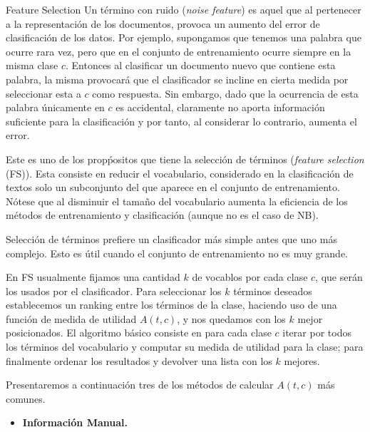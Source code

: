 \documentclass{llncs}
\begin{document}
	
	\begin{subsection}{Feature Selection}
		Un t\'ermino con ruido (\emph{noise feature}) es aquel que al pertenecer a la representaci\'on de los documentos, provoca un aumento del error de clasificaci\'on de los datos. Por ejemplo, supongamos que tenemos una palabra que ocurre rara vez, pero que en el conjunto de entrenamiento ocurre siempre en la misma clase $c$. Entonces al clasificar un documento nuevo que contiene esta palabra, la misma provocar\'a que el clasificador se incline en cierta medida por seleccionar esta a $c$ como respuesta. Sin embargo, dado que la ocurrencia de esta palabra \'unicamente en $c$ es accidental, claramente no aporta informaci\'on suficiente para la clasificaci\'on y por tanto, al considerar lo contrario, aumenta el error.
		
		Este es uno de los prop\'positos que tiene la selecci\'on de t\'erminos (\emph{feature selection} (FS)). Esta consiste en reducir el vocabulario, considerado en la clasificaci\'on de textos solo un subconjunto del que aparece en el conjunto de entrenamiento. N\'otese que al disminuir el tama\~no del vocabulario aumenta la eficiencia de los m\'etodos de entrenamiento y clasificaci\'on (aunque no es el caso de NB).
		
		Selecci\'on de t\'erminos prefiere un clasificador m\'as simple antes que uno m\'as complejo. Esto es \'util cuando el conjunto de entrenamiento no es muy grande.
		

		 En FS usualmente fijamos una cantidad $k$ de vocablos por cada clase $c$, que ser\'an los usados por el clasificador. Para seleccionar los $k$ t\'erminos deseados establecemos un ranking entre los t\'erminos de la clase, haciendo uso de una funci\'on de medida de utilidad $A(t,c)$, y nos quedamos con los $k$ mejor posicionados. El algoritmo b\'asico consiste en para cada clase $c$ iterar por todos los t\'erminos del vocabulario y computar su medida de utilidad para la clase; para finalmente ordenar los resultados y devolver una lista con los $k$ mejores.
		 
		 Presentaremos a continuaci\'on tres de los m\'etodos de calcular $A(t,c)$ m\'as comunes.
		
		\begin{itemize}
			\item\textbf{Informaci\'on Manual.}
			\smallskip
			

\end{itemize}
\end{subsection}
\end{document}
